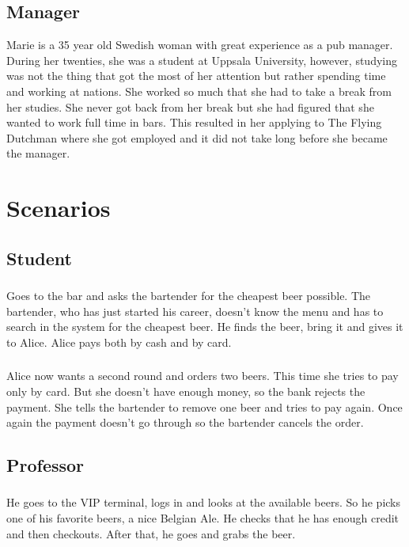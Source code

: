 \documentclass{article}
\begin{document}
\subsection{Manager}
Marie is a 35 year old Swedish woman with great experience as a pub manager. During her twenties, she was a student at Uppsala University, however, studying was not the thing that got the most of her attention but rather spending time and working at nations. She worked so much that she had to take a break from her studies. She never got back from her break but she had figured that she wanted to work full time in bars. This resulted in her applying to The Flying Dutchman where she got employed and it did not take long before she became the manager.
\section{Scenarios}
\label{sec:label}
\subsection{Student}
\subsubsection{}
Goes to the bar and asks the bartender for the cheapest beer possible. The bartender, who has just started his career, doesn’t know the menu and has to search in the system for the cheapest beer. He finds the beer, bring it and gives it to Alice. Alice pays both by cash and by card.
\subsubsection{}
Alice now wants a second round and orders two beers. This time she tries to pay only by card. But she doesn’t have enough money, so the bank rejects the payment. She tells the bartender to remove one beer and tries to pay again. Once again the payment doesn’t go through so the bartender cancels the order.
\subsection{Professor}
\subsubsection{}
He goes to the VIP terminal, logs in and looks at the available beers. So he picks one of his favorite beers, a nice Belgian Ale. He checks that he has enough credit and then checkouts. After that, he goes and grabs the beer.
\end{document}
